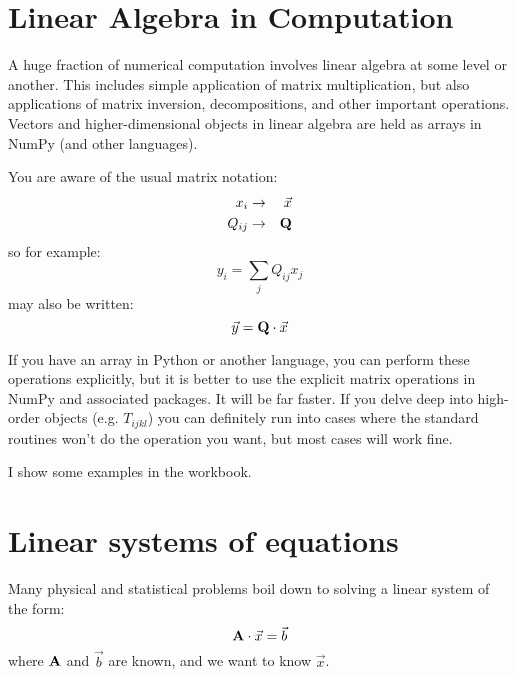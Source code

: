 \section{Linear Algebra in Computation}

A huge fraction of numerical computation involves linear algebra at
some level or another. This includes simple application of matrix
multiplication, but also applications of matrix inversion,
decompositions, and other important operations.  Vectors and
higher-dimensional objects in linear algebra are held as arrays in
NumPy (and other languages).

You are aware of the usual matrix notation:
\begin{eqnarray}
x_i &\rightarrow& \vec{x} \cr
Q_{ij} &\rightarrow& {\bf Q}
\end{eqnarray}
so for example:
\begin{equation}
y_i = \sum_j Q_{ij} x_j
\end{equation}
may also be written:
\begin{equation}
\vec{y} = {\bf Q}\cdot \vec{x}
\end{equation}

If you have an array in Python or another language, you can perform
these operations explicitly, but it is better to use the explicit
matrix operations in NumPy and associated packages. It will be far
faster. If you delve deep into high-order objects (e.g. $T_{ijkl}$)
you can definitely run into cases where the standard routines won't do
the operation you want, but most cases will work fine.

I show some examples in the workbook.

\section{Linear systems of equations}

Many physical and statistical problems boil down to solving a linear
system of the form:
\begin{equation}
{\bf A} \cdot \vec{x} = \vec{b}
\end{equation}
where ${\bf A}$ and $\vec{b}$ are known, and we want to know
$\vec{x}$.


